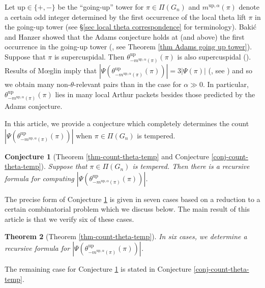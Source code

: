 \documentclass[11pt,letterpaper]{amsart}
\newcommand{\up}{{\mathrm{up}}}
\newtheorem{thm}{Theorem}[section]
\newtheorem{conj}[thm]{Conjecture}
\numberwithin{equation}{section}
\begin{document}
Let $\up\in\{+,-\}$ be the ``going-up'' tower for $\pi\in\Pi(G_n)$ and $m^{\up, \alpha}(\pi)$ denote a certain odd integer determined by the first occurrence of the local theta lift $\pi$ in the going-up tower (see \S\ref{sec local theta correspondence} for terminology). Baki{\'c} and Hanzer showed that the Adams conjecture holds at (and above) the first occurrence in the going-up tower (\cite[Theorem 2]{BH22}, see Theorem \ref{thm Adams going up tower}). Suppose that $\pi$ is supercuspidal. Then $\theta_{-m^{\up, \alpha}(\pi)}^\up(\pi)$ is also supercuspidal (\cite{Kud86}). Results of M{\oe}glin imply that $|\Psi(\theta_{-m^{\up, \alpha}(\pi)}^\up(\pi))|=3|\Psi(\pi)|$ (\cite{Moe06b,Moe09a}, see \cite[Theorem 7.5]{GGP20}) and so we obtain many non-$\theta$-relevant pairs than in the case for $\alpha\gg0$. In particular, $\theta_{-m^{\up, \alpha}(\pi)}^\up(\pi)$ lies in many local Arthur packets besides those predicted by the Adams conjecture.

In this article, we provide a conjecture which completely determines the count $|\Psi(\theta_{-m^{\up, \alpha}(\pi)}^\up(\pi))|$ when $\pi\in\Pi(G_n)$ is tempered. 

\begin{conj}[Theorem \ref{thm-count-theta-temp} and Conjecture \ref{conj-count-theta-temp}]\label{conj theta up first occur count intro}
   Suppose that $\pi\in\Pi(G_n)$ is tempered. Then there is a recursive formula for computing $|\Psi(\theta_{-m^{\up, \alpha}(\pi)}^\up(\pi))|$.
\end{conj}


The precise form of Conjecture \ref{conj theta up first occur count intro} is given in seven cases based on a reduction to a certain combinatorial problem which we discuss below. The main result of this article is that we verify six of these cases. 



\begin{thm}[Theorem \ref{thm-count-theta-temp}]\label{thm conjecture verification intro}
In six cases, we determine a recursive formula for $|\Psi(\theta_{-m^{\up, \alpha}(\pi)}^\up(\pi))|$.
\end{thm}

The remaining case for Conjecture \ref{conj theta up first occur count intro} is stated in Conjecture \ref{conj-count-theta-temp}.
\end{document}
